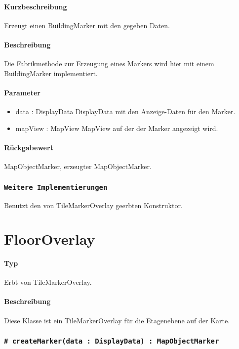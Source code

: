 \paragraph*{Kurzbeschreibung}
Erzeugt einen BuildingMarker mit den gegeben Daten.
\paragraph*{Beschreibung}
Die Fabrikmethode zur Erzeugung eines Markers wird hier mit einem BuildingMarker implementiert.
\paragraph*{Parameter}
\begin{itemize}
    \item data : DisplayData DisplayData mit den Anzeige-Daten für den Marker.
    \item mapView : MapView MapView auf der der Marker angezeigt wird.
\end{itemize}
\paragraph*{Rückgabewert}
MapObjectMarker, erzeugter MapObjectMarker.

\subsubsection{\texttt{Weitere Implementierungen}}%
Benutzt den von TileMarkerOverlay geerbten Konstruktor.

\section{FloorOverlay}
\paragraph*{Typ}
Erbt von TileMarkerOverlay.
\paragraph*{Beschreibung}
Diese Klasse ist ein TileMarkerOverlay für die Etagenebene auf der Karte.

\subsubsection{\texttt{\# createMarker(data : DisplayData) : MapObjectMarker}}%
